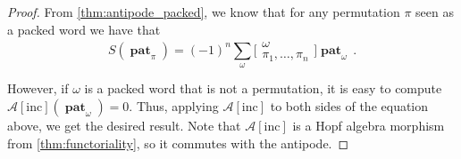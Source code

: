 \documentclass[12pt, reqno]{amsart}
\theoremstyle{definition}
\newtheorem{defin}[thm]{Definition}
\DeclareMathOperator{\pat}{\mathbf{pat}}
\begin{document}
\begin{proof}
From \cref{thm:antipode_packed}, we know that for any permutation $\pi$ seen as a packed word we have that
$$S(\pat_{\pi}) = (-1)^n \sum_{\omega} \bigl[\!\begin{smallmatrix} \omega \\ \pi_1, \dots, \pi_n \end{smallmatrix}\!\bigr] \pat_{\omega}\, . $$

However, if $\omega$ is a packed word that is not a permutation, it is easy to compute $\mathcal A[\mathrm{inc}] (\pat_{\omega}) = 0$.
Thus, applying $\mathcal A[\mathrm{inc}]$ to both sides of the equation above, we get the desired result.
Note that $\mathcal A[\mathrm{inc}]$ is a Hopf algebra morphism from \cref{thm:functoriality}, so it commutes with the antipode.
\end{proof}
%
%
%
%
%
%
\end{document}
